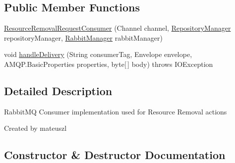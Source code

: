 \subsection*{Public Member Functions}
\begin{DoxyCompactItemize}
\item 
\hyperlink{classeu_1_1h2020_1_1symbiote_1_1messaging_1_1ResourceRemovalRequestConsumer_aba5553aba270fe213d42a950e5c3ccd6}{Resource\+Removal\+Request\+Consumer} (Channel channel, \hyperlink{classeu_1_1h2020_1_1symbiote_1_1repository_1_1RepositoryManager}{Repository\+Manager} repository\+Manager, \hyperlink{classeu_1_1h2020_1_1symbiote_1_1messaging_1_1RabbitManager}{Rabbit\+Manager} rabbit\+Manager)
\item 
void \hyperlink{classeu_1_1h2020_1_1symbiote_1_1messaging_1_1ResourceRemovalRequestConsumer_acddf45d794a218a11e496d11e47dd01c}{handle\+Delivery} (String consumer\+Tag, Envelope envelope, A\+M\+Q\+P.\+Basic\+Properties properties, byte\mbox{[}$\,$\mbox{]} body)  throws I\+O\+Exception 
\end{DoxyCompactItemize}


\subsection{Detailed Description}
Rabbit\+MQ Consumer implementation used for Resource Removal actions

Created by mateuszl 

\subsection{Constructor \& Destructor Documentation}
